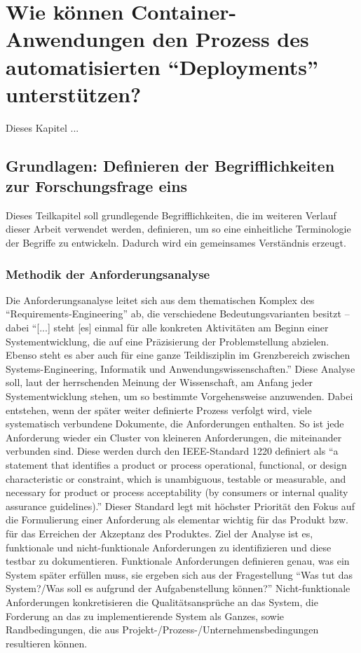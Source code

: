 \chapter[Forschungsfrage 1]{Wie können Container-Anwendungen den Prozess des automatisierten \enquote{Deployments} unterstützen?} \label{ff1}
Dieses Kapitel ...

\section{Grundlagen: Definieren der Begrifflichkeiten zur Forschungsfrage eins}
Dieses Teilkapitel soll grundlegende Begrifflichkeiten, die im weiteren Verlauf dieser Arbeit verwendet werden, definieren, um so eine einheitliche Terminologie der Begriffe zu entwickeln. Dadurch wird ein gemeinsames Verständnis erzeugt.

\subsection{Methodik der Anforderungsanalyse}\label{kap:methodikAnfAnalyse}
Die Anforderungsanalyse leitet sich aus dem thematischen Komplex des \enquote{Requirements-Engineering} ab, die verschiedene Bedeutungsvarianten besitzt -- dabei \enquote{[...] steht [es] einmal für alle konkreten Aktivitäten am Beginn einer Systementwicklung, die auf eine Präzisierung der Problemstellung abzielen. Ebenso steht es aber auch für eine ganze Teildisziplin im Grenzbereich zwischen Systems-Engineering, Informatik und Anwendungswissenschaften.}\autocite[][S.19]{partsch_requirements-engineering_2010} Diese Analyse soll, laut der herrschenden Meinung der Wissenschaft, am Anfang jeder Systementwicklung stehen, um so bestimmte Vorgehensweise anzuwenden. Dabei entstehen, wenn der später weiter definierte Prozess verfolgt wird, viele systematisch verbundene Dokumente, die Anforderungen enthalten. So ist jede Anforderung wieder ein Cluster von kleineren Anforderungen, die miteinander verbunden sind. Diese werden durch den IEEE-Standard 1220 definiert als \enquote{a statement that identifies a product or process operational, functional, or design characteristic or constraint, which is unambiguous, testable or measurable, and necessary for product or process acceptability (by consumers or internal quality assurance guidelines).}\autocite[][S.9]{IEEE1220-2005SystemsEng} Dieser Standard legt mit höchster Priorität den Fokus auf die Formulierung einer Anforderung als elementar wichtig für das Produkt bzw. für das Erreichen der Akzeptanz des Produktes. Ziel der Analyse ist es, funktionale und nicht-funktionale Anforderungen zu identifizieren und diese testbar zu dokumentieren. Funktionale Anforderungen definieren genau, was ein System später erfüllen muss, sie ergeben sich aus der Fragestellung \enquote{Was tut das System?/Was soll es aufgrund der Aufgabenstellung können?}\autocite[][S.27]{partsch_requirements-engineering_2010} Nicht-funktionale Anforderungen konkretisieren die Qualitätsansprüche an das System, die Forderung an das zu implementierende System als Ganzes, sowie Randbedingungen, die aus Projekt-/Prozess-/Unternehmensbedingungen resultieren können.\autocite[vgl.][S.27-29]{partsch_requirements-engineering_2010}

